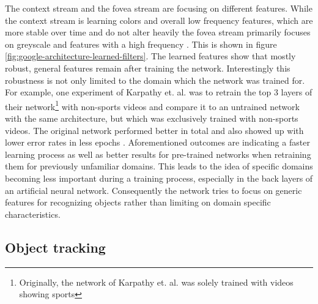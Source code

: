 \documentclass[12pt,twoside]{article}
\theoremstyle{plain}
\theoremstyle{definition}
\theoremstyle{remark}
\begin{document}
\noindent The context stream and the fovea stream are focusing on different features. While the context stream is learning colors and overall low frequency features, which are more stable over time and do not alter heavily the fovea stream primarily focuses on greyscale and features with a high frequency \cite{GoogleLargeScaleVideoClassification-Karpathy}. This is shown in figure \ref{fig:google-architecture-learned-filters}.
The learned features show that mostly robust, general features remain after training the network. Interestingly this robustness is not only limited to the domain which the network was trained for. For example, one experiment of Karpathy et. al. was to retrain the top 3 layers of their network\footnote{Originally, the network of Karpathy et. al. was solely trained with videos showing sports} with non-sports videos and compare it to an untrained network with the same architecture, but which was exclusively trained with non-sports videos. The original network performed better in total and also showed up with lower error rates in less epochs \cite{GoogleLargeScaleVideoClassification-Karpathy}. Aforementioned outcomes are indicating a faster learning process as well as better results for pre-trained networks when retraining them for previously unfamiliar domains. This leads to the idea of specific domains becoming less important during a training process, especially in the back layers of an artificial neural network. Consequently the network tries to focus on generic features for recognizing objects rather than limiting on domain specific characteristics.






\subsection{Object tracking}
\end{document}
